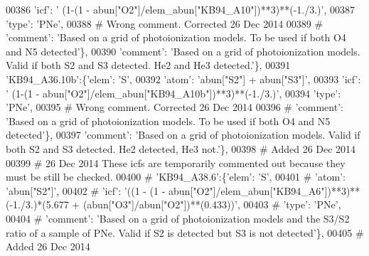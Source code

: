 \begin{DoxyCode}
00386                                      \textcolor{stringliteral}{'icf'}: \textcolor{stringliteral}{' (1-(1 - abun["O2"]/elem\_abun["KB94\_A10"])**3)**(-1./3.)'},
00387                                       \textcolor{stringliteral}{'type'}: \textcolor{stringliteral}{'PNe'},
00388 \textcolor{comment}{# Wrong comment. Corrected 26 Dec 2014}
00389 \textcolor{comment}{#                                      'comment': 'Based on a grid of photoionization models. To be used if
       both O4 and N5 detected'\},}
00390                                       \textcolor{stringliteral}{'comment'}: \textcolor{stringliteral}{'Based on a grid of photoionization models. Valid if both
       S2 and S3 detected. He2 and He3 detected.'}\},
00391                          \textcolor{stringliteral}{'KB94\_A36.10b'}:\{\textcolor{stringliteral}{'elem'}: \textcolor{stringliteral}{'S'},
00392                                      \textcolor{stringliteral}{'atom'}: \textcolor{stringliteral}{'abun["S2"] + abun["S3"]'},
00393                                      \textcolor{stringliteral}{'icf'}: \textcolor{stringliteral}{' (1-(1 - abun["O2"]/elem\_abun["KB94\_A10b"])**3)**(-1./3.)'},
00394                                       \textcolor{stringliteral}{'type'}: \textcolor{stringliteral}{'PNe'},
00395 \textcolor{comment}{# Wrong comment. Corrected 26 Dec 2014}
00396 \textcolor{comment}{#                                      'comment': 'Based on a grid of photoionization models. To be used if
       both O4 and N5 detected'\},}
00397                                       \textcolor{stringliteral}{'comment'}: \textcolor{stringliteral}{'Based on a grid of photoionization models. Valid if both
       S2 and S3 detected. He2 detected, He3 not.'}\},
00398 \textcolor{comment}{# Added 26 Dec 2014}
00399 \textcolor{comment}{# 26 Dec 2014 These icfs are temporarily commented out because they must be still be checked. }
00400 \textcolor{comment}{#                         'KB94\_A38.6':\{'elem': 'S',}
00401 \textcolor{comment}{#                                     'atom': 'abun["S2"]',}
00402 \textcolor{comment}{#                                     'icf': '((1 - (1 -
       abun["O2"]/elem\_abun["KB94\_A6"])**3)**(-1./3.)*(5.677 + (abun["O3"]/abun["O2"])**(0.433))',}
00403 \textcolor{comment}{#                                      'type': 'PNe',}
00404 \textcolor{comment}{#                                      'comment': 'Based on a grid of photoionization models and the S3/S2
       ratio of a sample of PNe. Valid if S2 is detected but S3 is not detected'\},}
00405 \textcolor{comment}{# Added 26 Dec 2014}

\end{DoxyCode}
